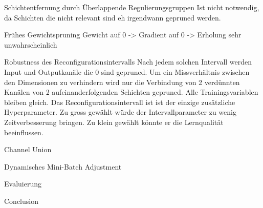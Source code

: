 \documentclass[10pt]{beamer}
\begin{document}
\begin{frame}{Schichtentfernung durch Überlappende Regulierungsgruppen}
 Ist nicht notwendig, da Schichten die nicht relevant sind eh irgendwann gepruned werden.
\end{frame}

\begin{frame}{Frühes Gewichtspruning}
 Gewicht auf 0 -> Gradient auf 0 -> Erholung sehr unwahrscheinlich
\end{frame}



\begin{frame}{Robustness des Reconfigurationsintervalls}
 Nach jedem solchen Intervall werden Input und Outputkanäle die 0 sind gepruned. Um ein Missverhältnis zwischen den Dimensionen zu verhindern wird nur die Verbindung von 2 verdünnten Kanälen von 2 aufeinanderfolgenden Schichten gepruned. Alle Trainingsvariablen bleiben gleich.
 Das Reconfigurationsintervall ist ist der einzige zusätzliche Hyperparameter. Zu gross gewählt würde der Intervallparameter zu wenig Zeitverbesserung bringen. Zu klein gewählt könnte er die Lernqualität beeinflussen.
\end{frame}

\begin{frame}{Channel Union}
 
\end{frame}


\begin{frame}{Dynamisches Mini-Batch Adjustment}
 
\end{frame}


\begin{frame}{Evaluierung}
 
\end{frame}


\begin{frame}{Conclusion}
 
\end{frame}
\end{document}
